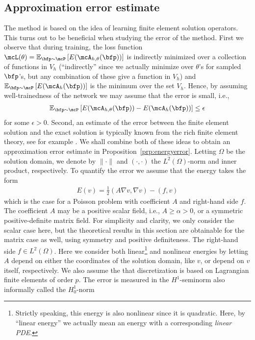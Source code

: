 \documentclass[12pt]{article}
\begin{document}
\subsection{Approximation error estimate} \label{sec_apperrest}
The method is based on the idea of learning finite element solution operators. This turns out to be beneficial when studying the error of the method. First we observe that during training, the loss function $\mcL(\theta) = \mathbb{E}_{\bfp \sim \mcP} \left[ E(\mcA_{h, \theta}(\bfp)) \right]$ is indirectly minimized over a collection of functions in $V_h$ (``indirectly'' since we actually minimize over $\theta$'s for sampled $\bfp$'s, but any combination of these give a function in $V_h$) and  $\mathbb{E}_{\bfp \sim \mcP} \left[ E(\mcA_{h}(\bfp)) \right]$ is the minimum over the set $V_h$. Hence, by assuming well-trainedness of the network we may assume that the error is small, i.e.,
\begin{align}
	\mathbb{E}_{\bfp \sim \mcP} \left[ E(\mcA_{h,\theta}(\bfp)) - E(\mcA_{h}(\bfp)) \right] \leq \epsilon
	\label{eq_assumpwelltrain}
\end{align}
for some $\epsilon>0$. Second, an estimate of the error between the finite element solution and the exact solution is typically known from the rich finite element theory, see for example \cite{brenner_scott}. We shall combine both of these ideas to obtain an approximation error estimate in Proposition~\ref{prp:energyerror}. Letting $\Omega$ be the solution domain, we denote by $\| \cdot \|$ and $(\cdot, \cdot)$ the $L^2(\Omega)$-norm and inner product, respectively. To quantify the error we assume that the energy takes the form
\begin{align}
	E(v) = \frac{1}{2}(A \nabla v,\nabla v) - (f,v)
	\label{eq_energyexp}
\end{align}
which is the case for a Poisson problem with coefficient $A$ and right-hand side $f$. The coefficient $A$ may be a positive scalar field, i.e., $A \geq \alpha > 0$, or a symmetric positive-definite matrix field. For simplicity and clarity, we only consider the scalar case here, but the theoretical results in this section are obtainable for the matrix case as well, using symmetry and positive definiteness. The right-hand side $f \in L^2(\Omega)$. Here we consider both linear\footnote{\label{fn_linen} Strictly speaking, this energy is also nonlinear since it is quadratic. Here, by ``linear energy'' we actually mean an energy with a corresponding \emph{linear PDE}.} and nonlinear energies by letting $A$ depend on either the coordinates of the solution domain, like $v$, or depend on $v$ itself, respectively. We also assume the that discretization is based on Lagrangian finite elements of order $p$. The error is measured in the $H^1$-seminorm also informally called the $H_0^1$-norm
\end{document}
